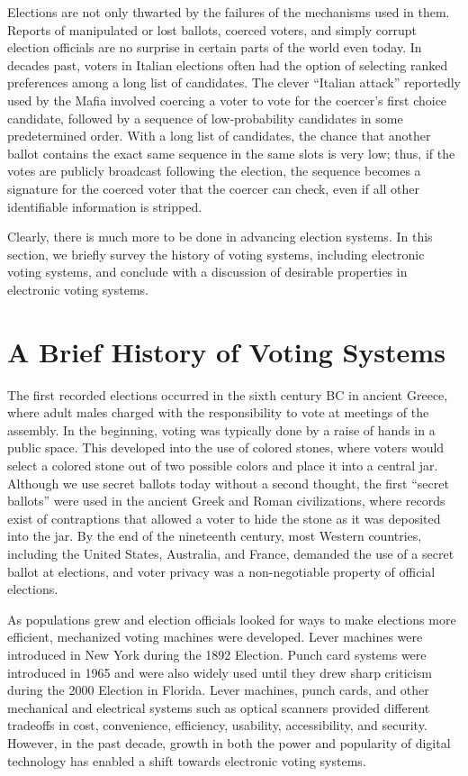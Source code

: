 Elections are not only thwarted by the failures of the mechanisms used in them. Reports of manipulated or lost ballots, coerced voters, and simply corrupt election officials are no surprise in certain parts of the world even today. In decades past, voters in Italian elections often had the option of selecting ranked preferences among a long list of candidates. The clever ``Italian attack'' reportedly used by the Mafia involved coercing a voter to vote for the coercer's first choice candidate, followed by a sequence of low-probability candidates in some predetermined order. With a long list of candidates, the chance that another ballot contains the exact same sequence in the same slots is very low; thus, if the votes are publicly broadcast following the election, the sequence becomes a signature for the coerced voter that the coercer can check, even if all other identifiable information is stripped.

Clearly, there is much more to be done in advancing election systems. In this section, we briefly survey the history of voting systems, including electronic voting systems, and conclude with a discussion of desirable properties in electronic voting systems.

\section{A Brief History of Voting Systems}

The first recorded elections occurred in the sixth century BC in ancient Greece, where adult males charged with the responsibility to vote at meetings of the assembly. In the beginning, voting was typically done by a raise of hands in a public space. This developed into the use of colored stones, where voters would select a colored stone out of two possible colors and place it into a central jar. Although we use secret ballots today without a second thought, the first ``secret ballots'' were used in the ancient Greek and Roman civilizations, where records exist of contraptions that allowed a voter to hide the stone as it was deposited into the jar. By the end of the nineteenth century, most Western countries, including the United States, Australia, and France, demanded the use of a secret ballot at elections, and voter privacy was a non-negotiable property of official elections.

As populations grew and election officials looked for ways to make elections more efficient, mechanized voting machines were developed. Lever machines were introduced in New York during the 1892 Election. Punch card systems were introduced in 1965 and were also widely used until they drew sharp criticism during the 2000 Election in Florida. Lever machines, punch cards, and other mechanical and electrical systems such as optical scanners provided different tradeoffs in cost, convenience, efficiency, usability, accessibility, and security. However, in the past decade, growth in both the power and popularity of digital technology has enabled a shift towards electronic voting systems.

